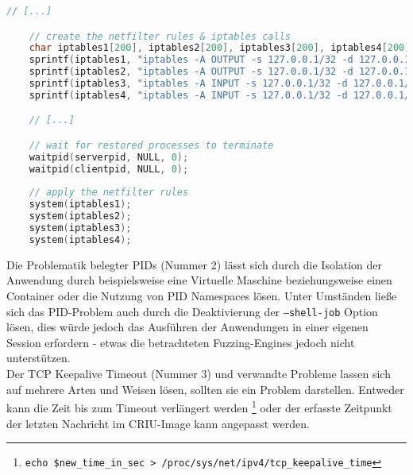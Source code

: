 \documentclass[a4paper]{article}
\begin{document}
\begin{lstlisting}[caption=Setzen der Firewallregeln, language=C]
    // [...]

    // create the netfilter rules & iptables calls
    char iptables1[200], iptables2[200], iptables3[200], iptables4[200];
    sprintf(iptables1, "iptables -A OUTPUT -s 127.0.0.1/32 -d 127.0.0.1/32 -p tcp -m mark ! --mark 0xc114 -m tcp --sport %i --dport %i -j DROP", clientport, serverport);
    sprintf(iptables2, "iptables -A OUTPUT -s 127.0.0.1/32 -d 127.0.0.1/32 -p tcp -m mark ! --mark 0xc114 -m tcp --sport %i --dport %i -j DROP", serverport, clientport);
    sprintf(iptables3, "iptables -A INPUT -s 127.0.0.1/32 -d 127.0.0.1/32 -p tcp -m mark ! --mark 0xc114 -m tcp --sport %i --dport %i -j DROP", clientport, serverport);
    sprintf(iptables4, "iptables -A INPUT -s 127.0.0.1/32 -d 127.0.0.1/32 -p tcp -m mark ! --mark 0xc114 -m tcp --sport %i --dport %i -j DROP", serverport, clientport);

    // [...]

    // wait for restored processes to terminate
    waitpid(serverpid, NULL, 0);
    waitpid(clientpid, NULL, 0);
    
    // apply the netfilter rules
    system(iptables1);
    system(iptables2);
    system(iptables3);
    system(iptables4);
\end{lstlisting}
Die Problematik belegter PIDs (Nummer 2) lässt sich durch die Isolation der Anwendung durch beispielsweise eine Virtuelle Maschine beziehungsweise einen Container oder die Nutzung von PID Namespaces\cite{pidns} lösen. 
Unter Umständen ließe sich das PID-Problem auch durch die Deaktivierung der \texttt{--shell-job} Option lösen, dies würde jedoch das Ausführen der Anwendungen in einer eigenen Session erfordern - etwas die betrachteten Fuzzing-Engines jedoch nicht unterstützen.\\
Der TCP Keepalive Timeout (Nummer 3) und verwandte Probleme lassen sich auf mehrere Arten und Weisen lösen, sollten sie ein Problem darstellen. Entweder kann die Zeit bis zum Timeout verlängert werden \footnote{\texttt{echo \$new\_time\_in\_sec > /proc/sys/net/ipv4/tcp\_keepalive\_time}} oder der erfasste Zeitpunkt der letzten Nachricht im CRIU-Image kann angepasst werden.
\end{document}
